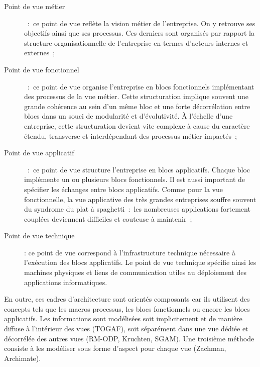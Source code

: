 \begin{description}

    \item[Point de vue métier]~:~ce point de vue reflète la vision métier de
    l'entreprise. On y retrouve ses objectifs ainsi que ses processus. Ces
    derniers sont organisés par rapport la structure organisationnelle de
    l'entreprise en termes d'acteurs internes et externes~;

    \item[Point de vue fonctionnel]~:~ce point de vue organise l'entreprise en
    blocs fonctionnels implémentant des processus de la vue métier. Cette
    structuration implique souvent une grande cohérence au sein d'un même bloc
    et une forte décorrélation entre blocs dans un souci de modularité et
    d'évolutivité. À l'échelle d'une entreprise, cette structuration devient
    vite complexe à cause du caractère étendu, transverse et interdépendant des
    processus métier impactés~;

    \item[Point de vue applicatif]~:~ce point de vue structure l'entreprise en
    blocs applicatifs. Chaque bloc implémente un ou plusieurs blocs
    fonctionnels. Il est aussi important de spécifier les échanges entre blocs
    applicatifs. Comme pour la vue fonctionnelle, la vue applicative des très
    grandes entreprises souffre souvent du syndrome du plat à spaghetti~:~les
    nombreuses applications fortement couplées deviennent difficiles et
    couteuse à maintenir~;

    \item[Point de vue technique] : ce point de vue correspond à
    l'infrastructure technique nécessaire à l'exécution des blocs applicatifs.
    Le point de vue technique spécifie ainsi les machines physiques et liens de
    communication utiles au déploiement des applications informatiques. 

\end{description}

En outre, ces cadres d'architecture sont orientés composants car ils utilisent
des concepts tels que les macros processus, les blocs fonctionnels ou encore
les blocs applicatifs. Les informations sont modélisées soit implicitement et
de manière diffuse à l'intérieur des vues (TOGAF), soit séparément dans une vue
dédiée et décorrélée des autres vues (RM-ODP, Kruchten, SGAM). Une troisième
méthode consiste à les modéliser sous forme d'aspect pour chaque vue (Zachman,
Archimate).

